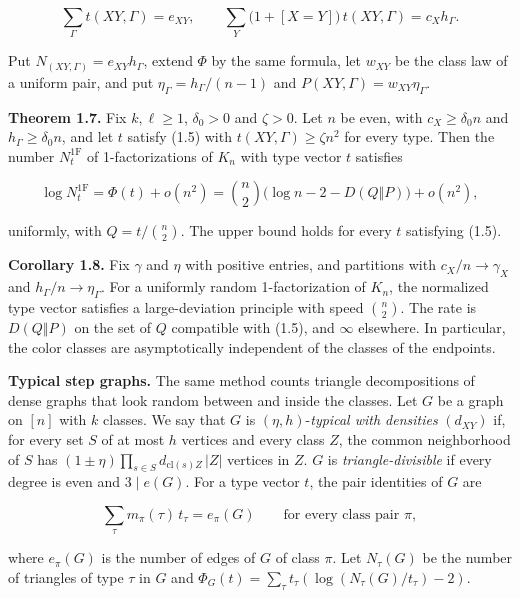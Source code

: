 \documentclass[english,11pt,a4paper]{article}
\begin{document}
\nopagebreak[4]
\[\sum_\Gamma t(XY,\Gamma)=e_{XY},\qquad \sum_Y\bigl(1+[X=Y]\bigr)\,t(XY,\Gamma)=c_Xh_\Gamma.\tag{1.5}\]

Put \(N_{(XY,\Gamma)}=e_{XY}h_\Gamma\), extend \(\Phi\) by the same formula, let \(w_{XY}\) be the class law of a uniform pair, and put \(\eta_\Gamma=h_\Gamma/(n-1)\) and \(P(XY,\Gamma)=w_{XY}\eta_\Gamma\).

\textbf{Theorem 1.7.} Fix \(k,\ell\ge1\), \(\delta_0>0\) and \(\zeta>0\). Let \(n\) be even, with \(c_X\ge\delta_0 n\) and \(h_\Gamma\ge\delta_0 n\), and let \(t\) satisfy (1.5) with \(t(XY,\Gamma)\ge\zeta n^2\) for every type. Then the number \(N^{1\mathrm F}_t\) of 1-factorizations of \(K_n\) with type vector \(t\) satisfies

\nopagebreak[4]
\[\log N^{1\mathrm F}_t=\Phi(t)+o(n^2)=\binom n2\bigl(\log n-2-D(Q\Vert P)\bigr)+o(n^2),\]

uniformly, with \(Q=t/\binom n2\). The upper bound holds for every \(t\) satisfying (1.5).

\textbf{Corollary 1.8.} Fix \(\gamma\) and \(\eta\) with positive entries, and partitions with \(c_X/n\to\gamma_X\) and \(h_\Gamma/n\to\eta_\Gamma\). For a uniformly random 1-factorization of \(K_n\), the normalized type vector satisfies a large-deviation principle with speed \(\binom n2\). The rate is \(D(Q\Vert P)\) on the set of \(Q\) compatible with (1.5), and \(\infty\) elsewhere. In particular, the color classes are asymptotically independent of the classes of the endpoints.

\textbf{Typical step graphs.} The same method counts triangle decompositions of dense graphs that look random between and inside the classes. Let \(G\) be a graph on \([n]\) with \(k\) classes. We say that \(G\) is \((\eta,h)\)-\emph{typical with densities} \((d_{XY})\) if, for every set \(S\) of at most \(h\) vertices and every class \(Z\), the common neighborhood of \(S\) has \((1\pm\eta)\prod_{s\in S}d_{\mathrm{cl}(s)Z}\,|Z|\) vertices in \(Z\). \(G\) is \emph{triangle-divisible} if every degree is even and \(3\mid e(G)\). For a type vector \(t\), the pair identities of \(G\) are

\nopagebreak[4]
\[\sum_\tau m_\pi(\tau)\,t_\tau=e_\pi(G)\qquad\text{for every class pair }\pi,\tag{1.6}\]

where \(e_\pi(G)\) is the number of edges of \(G\) of class \(\pi\). Let \(N_\tau(G)\) be the number of triangles of type \(\tau\) in \(G\) and \(\Phi_G(t)=\sum_\tau t_\tau(\log(N_\tau(G)/t_\tau)-2)\).
\end{document}
